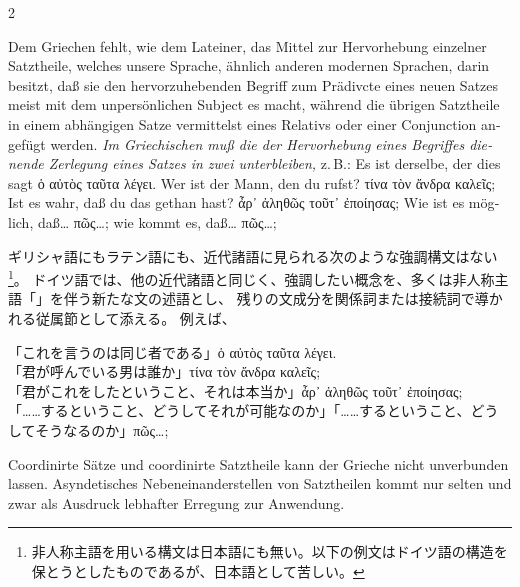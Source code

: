 \begin{paracol}{2}
\begin{enumerate}[leftmargin=0pt,rightmargin=0pt,listparindent =1cm,labelindent=1cm,labelsep=1ex,labelwidth={*},itemindent={*},align=left]
\begin{german}
\item Dem Griechen fehlt, wie dem Lateiner, das Mittel zur Hervorhebung
einzelner Satztheile, welches unsere Sprache, ähnlich anderen modernen
Sprachen, darin besitzt, daß sie den hervorzuhebenden Begriff zum
Prädivcte eines neuen Satzes meist mit dem unpersönlichen Subject
es macht, während die übrigen Satztheile in einem abhängigen Satze
vermittelst eines Relativs oder einer Conjunction angefügt werden.
\emph{Im Griechischen muß die der Hervorhebung eines Begriffes dienende
Zerlegung eines Satzes in zwei unterbleiben,} z.\,B.:  Es ist derselbe,
der dies sagt \textgreek[variant=ancient]{ὁ αὐτὸς ταῦτα λέγει}. Wer
ist der Mann, den du rufst? \textgreek[variant=ancient]{τίνα τὸν ἄνδρα
καλεῖς;} Ist es wahr, daß du das gethan hast? \textgreek[variant=ancient]{ἆρ᾽
ἀληθῶς τοῦτ᾽ ἐποίησας;} Wie ist es möglich, daß\ldots{} \textgreek[variant=ancient]{πῶς\ldots{};}
wie kommt es, daß\ldots{} \textgreek[variant=ancient]{πῶς\ldots{}; }
\end{german}
\switchcolumn

\begin{japanese}
ギリシャ語にもラテン語にも、近代諸語に見られる次のような強調構文はない\footnote{非人称主語を用いる構文は日本語にも無い。以下の例文はドイツ語の構造を保とうとしたものであるが、日本語として苦しい。}。
ドイツ語では、他の近代諸語と同じく、強調したい概念を、多くは非人称主語「」を伴う新たな文の述語とし、
残りの文成分を関係詞または接続詞で導かれる従属節として添える。
例えば、

「これを言うのは同じ者である」\textgreek[variant=ancient]{ὁ αὐτὸς ταῦτα λέγει}.\\
「君が呼んでいる男は誰か」\textgreek[variant=ancient]{τίνα τὸν ἄνδρα καλεῖς;}\\
「君がこれをしたということ、それは本当か」\textgreek[variant=ancient]{ἆρ᾽ ἀληθῶς τοῦτ᾽ ἐποίησας;}\\
「……するということ、どうしてそれが可能なのか」「……するということ、どうしてそうなるのか」\textgreek[variant=ancient]{πῶς\ldots{};}
\end{japanese}
\switchcolumn*

\begin{german}
\item Coordinirte Sätze und coordinirte Satztheile kann der Grieche nicht
unverbunden lassen. Asyndetisches Nebeneinanderstellen von Satztheilen
kommt nur selten und zwar als Aus\textcompwordmark{}druck lebhafter
Erregung zur Anwendung.
\end{german}
\switchcolumn


\end{enumerate}
\end{paracol}
